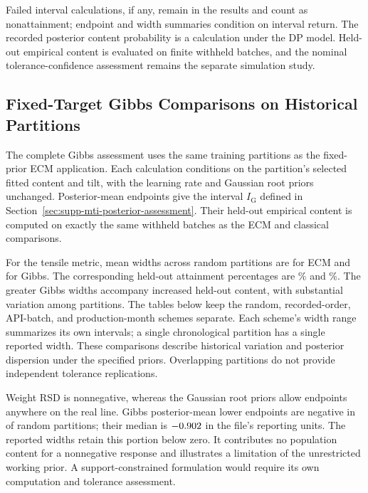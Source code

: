\documentclass[11pt]{article}
\begin{document}
Failed interval calculations, if any, remain in the results and count as
nonattainment; endpoint and width summaries condition on interval return.
The recorded posterior content probability is a calculation under the DP
model. Held-out empirical content is evaluated on finite withheld batches,
and the nominal tolerance-confidence assessment remains the separate
simulation study.


\subsection{Fixed-Target Gibbs Comparisons on Historical Partitions}
\label{sec:supp-pharma-gibbs}

The complete Gibbs assessment uses the same \MTIFullApplications{}
training partitions as the fixed-prior ECM application. Each calculation
conditions on the partition's selected fitted content and tilt, with the
learning rate and Gaussian root priors unchanged. Posterior-mean endpoints
give the interval \(I_{\mathrm G}\) defined in
Section~\ref{sec:supp-mti-posterior-assessment}. Their held-out empirical
content is computed on exactly the same withheld batches as the ECM and
classical comparisons.

For the tensile metric, mean widths across random partitions are
\MTIFullTensileECM{} for ECM and \MTIFullTensileGibbs{} for Gibbs.
The corresponding held-out attainment percentages are
\MTIFullTensileECMAttainment\% and \MTIFullTensileGibbsAttainment\%.
The greater Gibbs widths accompany increased held-out content, with
substantial variation among partitions. The tables below keep the random,
recorded-order, API-batch, and production-month schemes separate. Each
scheme's width range summarizes its own intervals; a single chronological
partition has a single reported width. These comparisons describe
historical variation and posterior dispersion under the specified priors.
Overlapping partitions do not provide independent tolerance replications.

Weight RSD is nonnegative, whereas the Gaussian root priors allow endpoints
anywhere on the real line. Gibbs posterior-mean lower endpoints are negative
in \MTIFixedRsdGibbsNegativeLower{} of \MTIFixedRsdRandomSplits{} random
partitions; their median is \(-0.902\) in the file's
reporting units. The reported widths retain this portion below zero.
It contributes no population content for a nonnegative response and illustrates
a limitation of the unrestricted working prior. A support-constrained
formulation would require its own computation and tolerance assessment.
\end{document}
